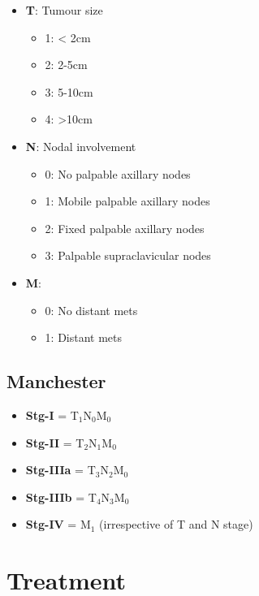 \documentclass[
  14pt,
]{memoir}
\providecommand{\tightlist}{%
  \setlength{\itemsep}{0pt}\setlength{\parskip}{0pt}}
\begin{document}
\begin{itemize}
\tightlist
\item
  \textbf{T}: Tumour size

  \begin{itemize}
  \tightlist
  \item
    1: \textless{} 2cm
  \item
    2: 2-5cm
  \item
    3: 5-10cm
  \item
    4: \textgreater10cm
  \end{itemize}
\item
  \textbf{N}: Nodal involvement

  \begin{itemize}
  \tightlist
  \item
    0: No palpable axillary nodes
  \item
    1: Mobile palpable axillary nodes
  \item
    2: Fixed palpable axillary nodes
  \item
    3: Palpable supraclavicular nodes
  \end{itemize}
\item
  \textbf{M}:

  \begin{itemize}
  \tightlist
  \item
    0: No distant mets
  \item
    1: Distant mets
  \end{itemize}
\end{itemize}

\hypertarget{manchester}{%
\subsection{Manchester}\label{manchester}}

\begin{itemize}
\tightlist
\item
  \textbf{Stg-I} = T\(_1\)N\(_0\)M\(_0\)
\item
  \textbf{Stg-II} = T\(_2\)N\(_1\)M\(_0\)
\item
  \textbf{Stg-IIIa} = T\(_3\)N\(_2\)M\(_0\)
\item
  \textbf{Stg-IIIb} = T\(_4\)N\(_3\)M\(_0\)
\item
  \textbf{Stg-IV} = M\(_1\) (irrespective of T and N stage)
\end{itemize}

\hypertarget{treatment-2}{%
\section{Treatment}\label{treatment-2}}
\end{document}
